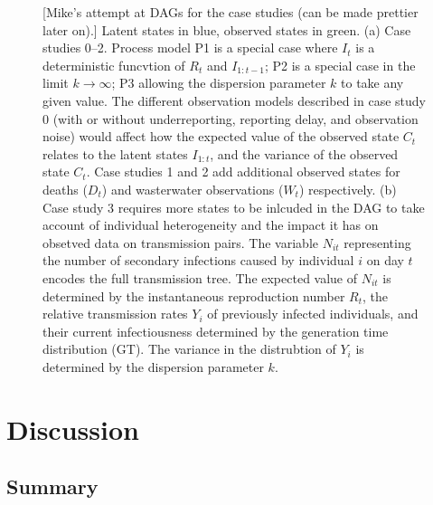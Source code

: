 \documentclass{article}
\begin{document}
\begin{figure}
\caption{[Mike's attempt at DAGs for the case studies (can be made prettier later on).] Latent states in blue, observed states in green. (a) Case studies 0--2. Process model P1 is a special case where $I_t$ is a deterministic funcvtion of $R_t$ and $I_{1:t-1}$; P2 is a special case in the limit $k\to\infty$; P3 allowing the dispersion parameter $k$ to take any given value. The different observation models described in case study 0 (with or without underreporting, reporting delay, and observation noise) would affect how the expected value of the observed state $C_t$ relates to the latent states $I_{1:t}$, and the variance of the observed state $C_t$. Case studies 1 and 2 add additional observed states for deaths ($D_t$) and wasterwater observations ($W_t$) respectively. (b) Case study 3 requires more states to be inlcuded in the DAG to take account of individual heterogeneity and the impact it has on obsetved data on transmission pairs. The variable $N_{it}$ representing the number of secondary infections caused by individual $i$ on day $t$ encodes the full transmission tree. The expected value of $N_{it}$ is determined by the instantaneous reproduction number $R_t$, the relative transmission rates $Y_i$ of previously infected individuals, and their current infectiousness determined by the generation time distribution (GT). The variance in the distrubtion of $Y_i$ is determined by the dispersion parameter $k$.  }
\end{figure}






\section{Discussion}

\subsection{Summary}
\end{document}
